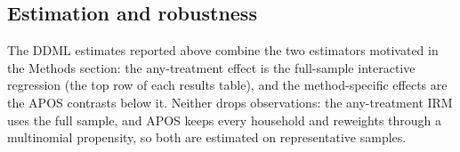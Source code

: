 \documentclass [11pt]{article}
\theoremstyle{plain}
\theoremstyle{definition}
\theoremstyle{remark}
\newcommand{\1}{\bm{1}}
\begin{document}

\subsection{Estimation and robustness}
The DDML estimates reported above combine the two estimators motivated in the Methods section: the any-treatment effect is the full-sample interactive regression (the top row of each results table), and the method-specific effects are the APOS contrasts below it. Neither drops observations: the any-treatment IRM uses the full sample, and APOS keeps every household and reweights through a multinomial propensity, so both are estimated on representative samples.
\end{document}
